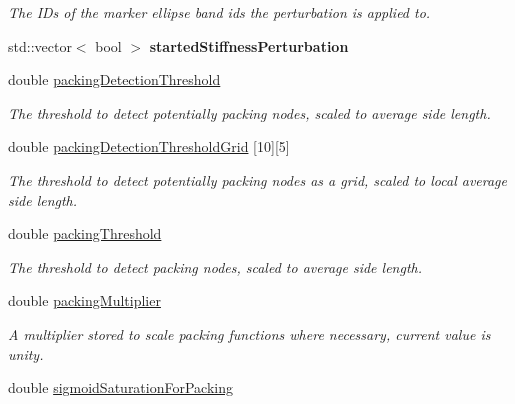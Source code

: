 \begin{DoxyCompactItemize}
\begin{DoxyCompactList}\small\item\em The I\+Ds of the marker ellipse band ids the perturbation is applied to. \end{DoxyCompactList}\item 
\hypertarget{classSimulation_a96269317c192e8f4682b45b2d272fce5}{}std\+::vector$<$ bool $>$ {\bfseries started\+Stiffness\+Perturbation}\label{classSimulation_a96269317c192e8f4682b45b2d272fce5}

\item 
\hypertarget{classSimulation_ab83a9bfa83ac45f58129afb916a129ce}{}double \hyperlink{classSimulation_ab83a9bfa83ac45f58129afb916a129ce}{packing\+Detection\+Threshold}\label{classSimulation_ab83a9bfa83ac45f58129afb916a129ce}

\begin{DoxyCompactList}\small\item\em The threshold to detect potentially packing nodes, scaled to average side length. \end{DoxyCompactList}\item 
\hypertarget{classSimulation_a0c55eae62bd214951ca78098e2daf7a4}{}double \hyperlink{classSimulation_a0c55eae62bd214951ca78098e2daf7a4}{packing\+Detection\+Threshold\+Grid} \mbox{[}10\mbox{]}\mbox{[}5\mbox{]}\label{classSimulation_a0c55eae62bd214951ca78098e2daf7a4}

\begin{DoxyCompactList}\small\item\em The threshold to detect potentially packing nodes as a grid, scaled to local average side length. \end{DoxyCompactList}\item 
\hypertarget{classSimulation_afa0e72518548c938a0c4974e432f9d83}{}double \hyperlink{classSimulation_afa0e72518548c938a0c4974e432f9d83}{packing\+Threshold}\label{classSimulation_afa0e72518548c938a0c4974e432f9d83}

\begin{DoxyCompactList}\small\item\em The threshold to detect packing nodes, scaled to average side length. \end{DoxyCompactList}\item 
\hypertarget{classSimulation_a7a39e3f43e8c3af42da95a827a0a7d5d}{}double \hyperlink{classSimulation_a7a39e3f43e8c3af42da95a827a0a7d5d}{packing\+Multiplier}\label{classSimulation_a7a39e3f43e8c3af42da95a827a0a7d5d}

\begin{DoxyCompactList}\small\item\em A multiplier stored to scale packing functions where necessary, current value is unity. \end{DoxyCompactList}\item 
\hypertarget{classSimulation_a518ef4319a889b505ff0047fc30a1665}{}double \hyperlink{classSimulation_a518ef4319a889b505ff0047fc30a1665}{sigmoid\+Saturation\+For\+Packing}\label{classSimulation_a518ef4319a889b505ff0047fc30a1665}


\end{DoxyCompactItemize}
